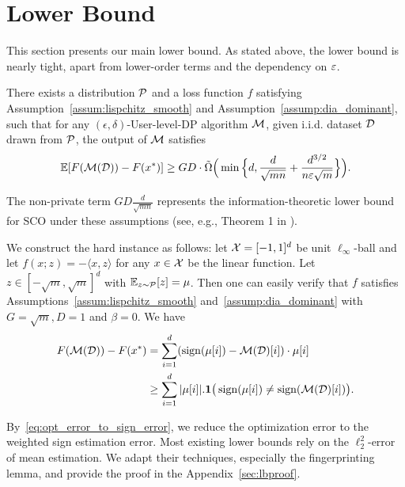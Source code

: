 \section{Lower Bound}
This section presents our main lower bound. As stated above, the lower bound is nearly tight, apart from lower-order terms and the dependency on $\varepsilon$.

\begin{theorem}
\label{thm:lb}
There exists a distribution $\mathcal{P}$ and a loss function $f$  satisfying Assumption~\ref{assum:lispchitz_smooth} and Assumption~\ref{assump:dia_dominant}, such that for any $(\epsilon,\delta)$-User-level-DP algorithm $\mathcal{M}$, given i.i.d. dataset $\mathcal{D}$ drawn from $\mathcal{P}$, the output of $\mathcal{M}$ satisfies
\begin{align*}
    \operatorname*{\mathbb{E}}[F(\mathcal{M}(\mathcal{D}))-F(x^*)]\ge GD\cdot \Tilde{\Omega}\Big(\min\Big\{d,\frac{d}{\sqrt{mn}}+\frac{d^{3/2}}{n\varepsilon\sqrt{m}}\Big\}\Big).
\end{align*}
\end{theorem}

The non-private term $GD\frac{d}{\sqrt{mn}}$ represents the information-theoretic lower bound for SCO under these assumptions (see, e.g., Theorem 1 in \cite{agarwal2009information}).  


We construct the hard instance as follows:
let $\mathcal{X}=[-1,1]^d$ be unit $\ell_\infty$-ball and let $f(x;z)=-\langle x,z\rangle$ for any $x\in \mathcal{X}$ be the linear function.
Let $z\in[-\sqrt{m},\sqrt{m}]^d$  with $\operatorname*{\mathbb{E}}_{z\sim\mathcal{P}}[z]=\mu$.
Then one can easily verify that $f$ satisfies Assumptions~\ref{assum:lispchitz_smooth} and~\ref{assump:dia_dominant} with $G=\sqrt{m},D=1$ and $\beta=0$.
We have
\begin{align}
    F(\mathcal{M}(\mathcal{D}))-F(x^*) &= \sum_{i=1}^{d} (\operatorname{sign}(\mu[i])-\mathcal{M}(\mathcal{D})[i])\cdot\mu[i]
   \nonumber \\ &\ge \sum_{i=1}^{d}  |\mu[i]|.\mathbf{1}\big(\operatorname{sign}(\mu[i])\neq\operatorname{sign}(\mathcal{M}(\mathcal{D})[i])\big). \label{eq:opt_error_to_sign_error}
\end{align}

By~\eqref{eq:opt_error_to_sign_error}, we reduce the optimization error to the weighted sign estimation error.  
Most existing lower bounds rely on the $\ell^2_2$-error of mean estimation.  
We adapt their techniques, especially the fingerprinting lemma, and provide the proof in the Appendix~\ref{sec:lbproof}.